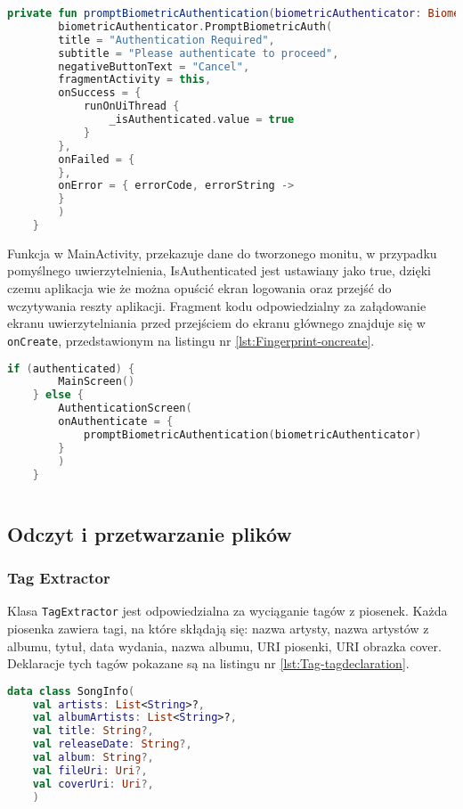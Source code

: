 \begin{lstlisting}[caption=Obsługa wyniku monitu, label={lst:Fingerprint-monitfinish}, language=kotlin]
	private fun promptBiometricAuthentication(biometricAuthenticator: BiometricAuthenticator) {
		biometricAuthenticator.PromptBiometricAuth(
		title = "Authentication Required",
		subtitle = "Please authenticate to proceed",
		negativeButtonText = "Cancel",
		fragmentActivity = this,
		onSuccess = {
			runOnUiThread {
				_isAuthenticated.value = true
			}
		},
		onFailed = {
		},
		onError = { errorCode, errorString ->
		}
		)
	}
\end{lstlisting}
Funkcja w MainActivity, przekazuje dane do tworzonego monitu, w przypadku pomyślnego uwierzytelnienia, IsAuthenticated jest ustawiany jako true, dzięki czemu aplikacja wie że można opuścić ekran logowania oraz przejść do wczytywania reszty aplikacji. Fragment kodu odpowiedzialny za załądowanie ekranu uwierzytelniania przed przejściem do ekranu głównego znajduje się w \texttt{onCreate}, przedstawionym na listingu nr \ref{lst:Fingerprint-oncreate}.
\begin{lstlisting}[caption=Zawartosć \texttt{onCreate}, label={lst:Fingerprint-oncreate}, language=kotlin]
	if (authenticated) {
		MainScreen()
	} else {
		AuthenticationScreen(
		onAuthenticate = {
			promptBiometricAuthentication(biometricAuthenticator)
		}
		)
	}
	
\end{lstlisting}

\subsection{Odczyt i przetwarzanie plików}

\subsubsection{Tag Extractor}
Klasa \texttt{TagExtractor} jest odpowiedzialna za wyciąganie tagów z piosenek. Każda piosenka zawiera tagi, na które skłądają się: nazwa artysty, nazwa artystów z albumu, tytuł, data wydania, nazwa albumu, URI piosenki, URI obrazka cover. Deklaracje tych tagów pokazane są na listingu nr \ref{lst:Tag-tagdeclaration}.


\begin{lstlisting}[caption=Deklaracja tagów, label={lst:Tag-tagdeclaration}, language=kotlin]
	data class SongInfo(
	val artists: List<String>?,
	val albumArtists: List<String>?,
	val title: String?,
	val releaseDate: String?,
	val album: String?,
	val fileUri: Uri?,
	val coverUri: Uri?,
	)
	
\end{lstlisting}

